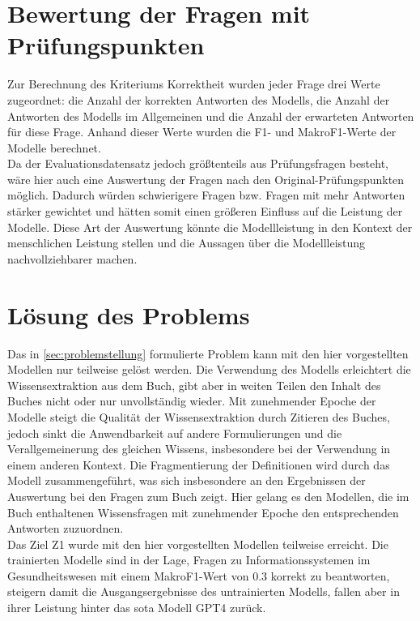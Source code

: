 \section{Bewertung der Fragen mit Prüfungspunkten}
Zur Berechnung des Kriteriums Korrektheit wurden jeder Frage drei Werte zugeordnet: die Anzahl der korrekten Antworten des Modells, die Anzahl der Antworten des Modells im Allgemeinen und die Anzahl der erwarteten Antworten für diese Frage.
Anhand dieser Werte wurden die F1- und MakroF1-Werte der Modelle berechnet.\\

Da der Evaluationsdatensatz jedoch größtenteils aus Prüfungsfragen besteht, wäre hier auch eine Auswertung der Fragen nach den Original-Prüfungspunkten möglich.
Dadurch würden schwierigere Fragen bzw. Fragen mit mehr Antworten stärker gewichtet und hätten somit einen größeren Einfluss auf die Leistung der Modelle.
Diese Art der Auswertung könnte die Modellleistung in den Kontext der menschlichen Leistung stellen und die Aussagen über die Modellleistung nachvollziehbarer machen.

\section{Lösung des Problems}
Das in \cref{sec:problemstellung} formulierte Problem kann mit den hier vorgestellten Modellen nur teilweise gelöst werden.
Die Verwendung des Modells erleichtert die Wissensextraktion aus dem Buch, gibt aber in weiten Teilen den Inhalt des Buches nicht oder nur unvollständig wieder.
Mit zunehmender Epoche der Modelle steigt die Qualität der Wissensextraktion durch Zitieren des Buches, jedoch sinkt die Anwendbarkeit auf andere Formulierungen und die Verallgemeinerung des gleichen Wissens, insbesondere bei der Verwendung in einem anderen Kontext.
Die Fragmentierung der Definitionen wird durch das Modell zusammengeführt, was sich insbesondere an den Ergebnissen der Auswertung bei den Fragen zum Buch zeigt.
Hier gelang es den Modellen, die im Buch enthaltenen Wissensfragen mit zunehmender Epoche den entsprechenden Antworten zuzuordnen.\\

Das Ziel Z1 wurde mit den hier vorgestellten Modellen teilweise erreicht.
Die trainierten Modelle sind in der Lage, Fragen zu Informationssystemen im Gesundheitswesen mit einem MakroF1-Wert von \num{0.3} korrekt zu beantworten, steigern damit die Ausgangsergebnisse des untrainierten Modells, fallen aber in ihrer Leistung hinter das \ac{sota} Modell GPT4 zurück.\\

